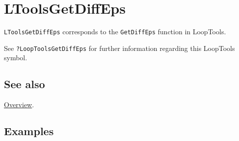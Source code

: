 \documentclass[../FeynHelpersManual.tex]{subfiles}
\begin{document}
\hypertarget{ltoolsgetdiffeps}{
\section{LToolsGetDiffEps}\label{ltoolsgetdiffeps}}

\texttt{LToolsGetDiffEps} corresponds to the \texttt{GetDiffEps}
function in LoopTools.

See \texttt{?LoopTools\textasciigrave GetDiffEps} for further
information regarding this LoopTools symbol.

\subsection{See also}

\hyperlink{toc}{Overview}.

\subsection{Examples}
\end{document}
